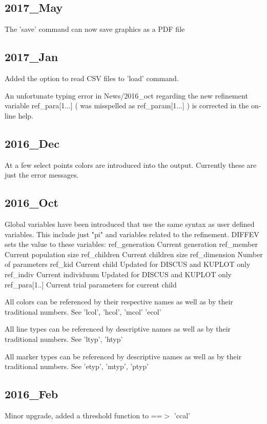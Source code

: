 \subsection*{2017\_May}
\par
The 'save' command can now save graphics as a PDF file 
\subsection*{2017\_Jan}
\par
Added the option to read CSV files to 'load' command. 
\par
An unfortunate typing error in News/2016\_oct regarding the new 
refinement variable 
ref\_para[1...]   ( was misspelled as ref\_param[1...] ) 
is corrected in the  on-line help. 
\subsection*{2016\_Dec}
\par
At a few select points colors are introduced into the output. 
Currently these are just the error messages. 
\par
\subsection*{2016\_Oct}
\par
Global variables have been introduced that use the same syntax as 
user defined variables. This include just "pi" and variables related 
to the refinement. 
DIFFEV sets the value to these variables: 
ref\_generation  Current generation 
ref\_member      Current population size 
ref\_children    Current children size 
ref\_dimension   Number of parameters 
ref\_kid         Current child Updated for DISCUS and KUPLOT only 
ref\_indiv       Current individuum Updated for DISCUS and KUPLOT only 
ref\_para[1..]   Current trial parameters for current child 
\par
All colors can be referenced by their respective names as well as by 
their traditional numbers. See 'lcol', 'hcol', 'mcol' 'ecol' 
\par
All line types can be referenced by descriptive names as well as by 
their traditional numbers. See 'ltyp', 'htyp' 
\par
All marker types can be referenced by descriptive names as well as by 
their traditional numbers. See 'etyp', 'mtyp', 'ptyp' 
\subsection*{2016\_Feb}
\par
Minor upgrade, added a threshold function to ==$> $ 'ccal' 

